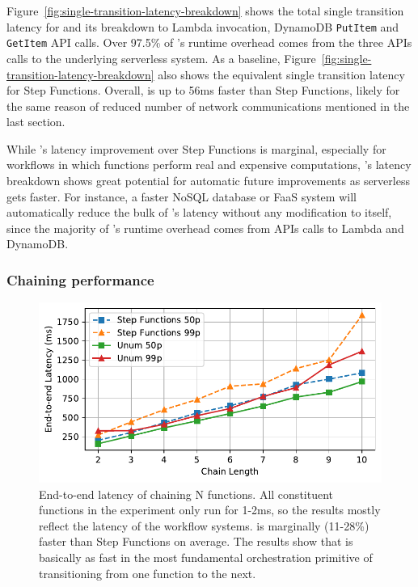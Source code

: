 Figure~\ref{fig:single-transition-latency-breakdown} shows the total single
transition latency for \name{} and its breakdown to Lambda invocation,
DynamoDB \texttt{PutItem} and \texttt{GetItem} API calls. Over 97.5\% of
\name{}'s runtime overhead comes from the three APIs calls to the underlying
serverless system. As a baseline,
Figure~\ref{fig:single-transition-latency-breakdown} also shows the equivalent
single transition latency for Step Functions. Overall, \name{} is up to 56ms
faster than Step Functions, likely for the same reason of reduced number of
network communications mentioned in the last section.

While \name{}'s latency improvement over Step Functions is marginal,
especially for workflows in which functions perform real and expensive
computations, \name{}'s latency breakdown shows great potential for automatic
future improvements as serverless gets faster. For instance, a
faster NoSQL database or FaaS system will automatically reduce the bulk of
\name{}'s latency without any modification to \name{} itself, since the majority of
\name{}'s runtime overhead comes from APIs calls to Lambda and DynamoDB.

\subsubsection{Chaining performance}\label{sec:eval:chain}

\begin{figure}[t]
  \centering
  \includegraphics[width=\columnwidth]{figures/ChainMicroLatency.pdf}
  \caption{End-to-end latency of chaining N functions. All constituent
    functions in the experiment only run for 1-2ms, so the results mostly
    reflect the latency of the workflow systems. \name{} is marginally
    (11-28\%) faster than Step Functions on average. The results show that
    \name{} is basically as fast in the most fundamental orchestration
    primitive of transitioning from one function to the next.}
  \label{fig:chainmicrolatency}
\end{figure}


